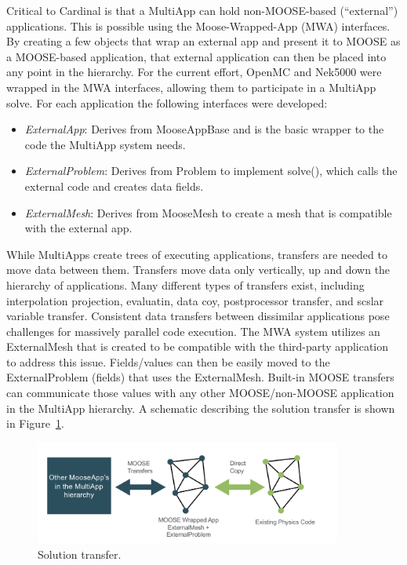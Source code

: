 Critical to Cardinal is that a MultiApp can hold non-MOOSE-based (``external'') applications. This is possible using the Moose-Wrapped-App (MWA) interfaces. By creating a few objects that wrap an external app and present it to MOOSE as a MOOSE-based application, that external application can then be placed into any point in the hierarchy. For the current effort, OpenMC and Nek5000 were wrapped in the MWA interfaces, allowing them to participate in a MultiApp solve. For each application the following interfaces were developed:
\begin{itemize}
    \item \textit{ExternalApp}: Derives from MooseAppBase and is the basic wrapper to the code the MultiApp
    system needs.
    \item \textit{ExternalProblem}: Derives from Problem to implement solve(), which calls the external code and creates data fields.
    \item \textit{ExternalMesh}: Derives from MooseMesh to create a mesh that is compatible with the external app.
\end{itemize}
While MultiApps create trees of executing applications, transfers are needed to move data between them. Transfers move data only vertically, up and down the hierarchy of applications. Many different types of transfers exist, including interpolation projection, evaluatin, data coy, postprocessor transfer, and scslar variable transfer.
Consistent data transfers between dissimilar applications pose challenges for massively parallel code execution.  The MWA system utilizes an ExternalMesh that is created to be compatible with the third-party application to address this issue. Fields/values can then be easily moved to the ExternalProblem (fields) that uses the ExternalMesh. Built-in MOOSE transfers can communicate those values with any other MOOSE/non-MOOSE application in the MultiApp hierarchy. A schematic describing the solution transfer is shown in Figure~\ref{f:moose2}.

\begin{figure}[!h]
\centering
\includegraphics[clip=true,width=0.9\textwidth]{Figures/moose2}
\caption{Solution transfer.}
\label{f:moose2}
\end{figure}

